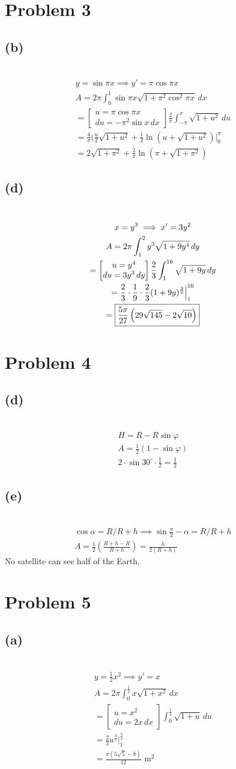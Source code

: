 \documentclass[12pt]{article}
\newcommand*{\paren}[1]{\ensuremath\left(#1\right)}
\newcommand{\at}{\Big|}
\newcommand{\problem}[1]{\section{Problem #1}}
\newcommand{\subproblem}[1]{\subsection{(#1)} \,}
\begin{document}
\problem{3}

\subproblem{b}
\begin{gather*}
    y=\sin \pi x\implies y' = \pi \cos \pi x\\
    A=2\pi\int _0^1 \sin \pi x \sqrt{1+\pi^2\cos^2 \pi x} \, dx\\
    = \begin{bmatrix}
        u=\pi \cos \pi x\\
        du=- \pi^2 \sin x\, dx
    \end{bmatrix}
    \frac{2}{\pi} \int_{-\pi}^\pi \sqrt{1+u^2 } \, du\\
    =\frac{4}{\pi} (\frac{u}{2}\sqrt{1+u^2}+\frac{1}{2}\ln (u+\sqrt{1+u^2}) \at_0^\pi \\
    = \boxed{2\sqrt{1+\pi^2} + \frac{2}{\pi} \ln (\pi + \sqrt{1+\pi^2})}
\end{gather*}

\subproblem{d}
\begin{gather*}
    x=y^3 \implies x'=3y^2\\
    A=2\pi \int_1^2 y^3\sqrt{1+9y^4} \, dy\\
    = \begin{bmatrix}
        u=y^4\\
        du=3y^3\, dy
    \end{bmatrix} \frac{2}{3}\int_1^{16} \sqrt{1+9y} \, dy\\
    =  \frac{2}{3} \cdot \frac{1}{9} \cdot \frac{2}{3} (1+9y)^\frac{3}{2}\at_1^{16}\\
    = \boxed{\frac{5\pi}{27} \paren{29\sqrt{145} - 2\sqrt{10}}}
\end{gather*}

\problem{4}

\subproblem{d}
\begin{gather*}
    H=R-R\sin \varphi\\
    A=\boxed{\frac{1}{2}(1-\sin \varphi)}\\
    2\cdot \sin 30^\circ \cdot \frac{1}{2} = \boxed{\frac{1}{2}}
\end{gather*}

\subproblem{e}
\begin{gather*}
    \cos \alpha = R/R+h \implies \sin \frac{\pi}{2}-\alpha =R/R+h\\
    A=\frac{1}{2}(\frac{R+h-R}{R+h})= \boxed{\frac{h}{2(R+h)}}
\end{gather*}
No satellite can see half of the Earth. 

\problem{5}

\subproblem{a}
\begin{gather*}
    y=\frac{1}{2}x^2\implies y'=x\\
    A=2\pi \int_0^\frac{1}{2} x\sqrt{1+x^2} \, dx\\
    = \begin{bmatrix}
        u=x^2\\
        du=2x\,d x
    \end{bmatrix} \int_0^\frac{1}{4} \sqrt{1+u} \, du\\
    = \frac{2}{3}u^\frac{3}{2} \at_1^\frac{5}{4}\\
    =\frac{\pi(5\sqrt{5} - 8)}{12} \text{ m}^2\\
\end{gather*}
\end{document}
